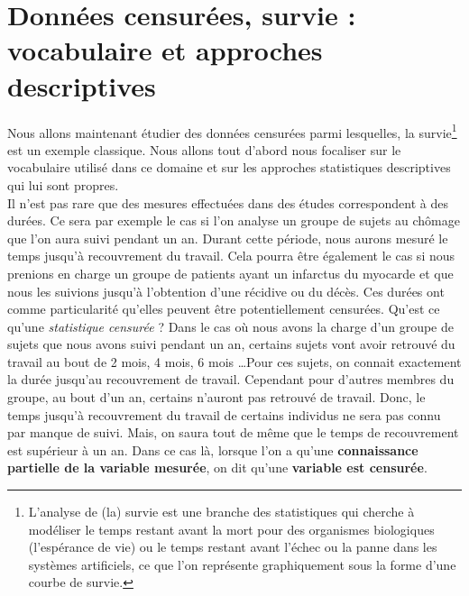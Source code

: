 \newpage




\section{Données censurées, survie : vocabulaire et approches descriptives}
Nous allons maintenant étudier des données censurées parmi lesquelles, la survie\footnote{L'analyse de (la) survie est une branche des statistiques qui cherche à modéliser le temps restant avant la mort pour des organismes biologiques (l'espérance de vie) ou le temps restant avant l'échec ou la panne dans les systèmes artificiels, ce que l'on représente graphiquement sous la forme d'une courbe de survie. } est un exemple classique.\newline
Nous allons tout d'abord nous focaliser sur le vocabulaire utilisé dans ce domaine et sur les approches statistiques descriptives qui lui sont propres.\newline
\\
Il n'est pas rare que des mesures effectuées dans des études correspondent à des durées. Ce sera par exemple le cas si l'on analyse un groupe de sujets au chômage que l'on aura suivi pendant un an. Durant cette période, nous aurons mesuré le temps jusqu'à recouvrement du travail.\newline
Cela pourra être également le cas si nous prenions en charge un groupe de patients ayant un infarctus du myocarde et que nous les suivions jusqu'à l'obtention d'une récidive ou du décès.\newline
Ces durées ont comme particularité qu'elles peuvent être potentiellement censurées.\newline
Qu'est ce qu'une \textit{statistique censurée} ? Dans le cas où nous avons la charge d'un groupe de sujets que nous avons suivi pendant un an, certains sujets vont avoir retrouvé du travail au bout de 2 mois, 4 mois, 6 mois \dots Pour ces sujets, on connait exactement la durée jusqu'au recouvrement de travail. Cependant pour d'autres membres du groupe, au bout d'un an, certains n'auront pas retrouvé de travail. Donc, le temps jusqu'à recouvrement du travail de certains individus ne sera pas connu par manque de suivi. Mais, on saura tout de même que le temps de recouvrement est supérieur à un an. Dans ce cas là, lorsque l'on a qu'une \textbf{connaissance partielle de la variable mesurée}, on dit qu'une \textbf{variable est censurée}.\newline 
